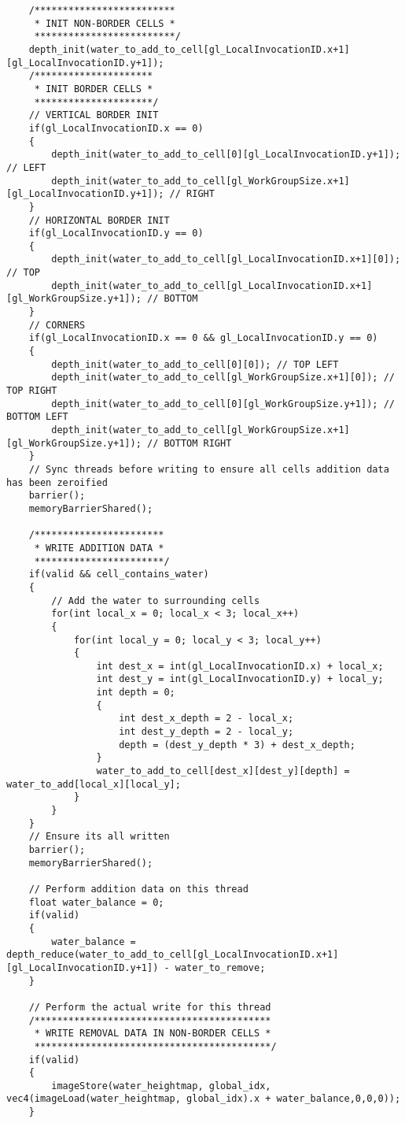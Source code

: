 \begin{verbatim}
    /*************************
     * INIT NON-BORDER CELLS *
     *************************/
    depth_init(water_to_add_to_cell[gl_LocalInvocationID.x+1][gl_LocalInvocationID.y+1]);
    /*********************
     * INIT BORDER CELLS *
     *********************/
    // VERTICAL BORDER INIT
    if(gl_LocalInvocationID.x == 0)
    {
        depth_init(water_to_add_to_cell[0][gl_LocalInvocationID.y+1]); // LEFT
        depth_init(water_to_add_to_cell[gl_WorkGroupSize.x+1][gl_LocalInvocationID.y+1]); // RIGHT
    }
    // HORIZONTAL BORDER INIT
    if(gl_LocalInvocationID.y == 0)
    {
        depth_init(water_to_add_to_cell[gl_LocalInvocationID.x+1][0]); // TOP
        depth_init(water_to_add_to_cell[gl_LocalInvocationID.x+1][gl_WorkGroupSize.y+1]); // BOTTOM
    }
    // CORNERS
    if(gl_LocalInvocationID.x == 0 && gl_LocalInvocationID.y == 0)
    {
        depth_init(water_to_add_to_cell[0][0]); // TOP LEFT
        depth_init(water_to_add_to_cell[gl_WorkGroupSize.x+1][0]); // TOP RIGHT
        depth_init(water_to_add_to_cell[0][gl_WorkGroupSize.y+1]); // BOTTOM LEFT
        depth_init(water_to_add_to_cell[gl_WorkGroupSize.x+1][gl_WorkGroupSize.y+1]); // BOTTOM RIGHT
    }
    // Sync threads before writing to ensure all cells addition data has been zeroified
    barrier();
    memoryBarrierShared();

    /***********************
     * WRITE ADDITION DATA *
     ***********************/
    if(valid && cell_contains_water)
    {
        // Add the water to surrounding cells
        for(int local_x = 0; local_x < 3; local_x++)
        {
            for(int local_y = 0; local_y < 3; local_y++)
            {
                int dest_x = int(gl_LocalInvocationID.x) + local_x;
                int dest_y = int(gl_LocalInvocationID.y) + local_y;
                int depth = 0;
                {
                    int dest_x_depth = 2 - local_x;
                    int dest_y_depth = 2 - local_y;
                    depth = (dest_y_depth * 3) + dest_x_depth;
                }
                water_to_add_to_cell[dest_x][dest_y][depth] = water_to_add[local_x][local_y];
            }
        }
    }
    // Ensure its all written
    barrier();
    memoryBarrierShared();

    // Perform addition data on this thread
    float water_balance = 0;
    if(valid)
    {
        water_balance = depth_reduce(water_to_add_to_cell[gl_LocalInvocationID.x+1][gl_LocalInvocationID.y+1]) - water_to_remove;
    }

    // Perform the actual write for this thread
    /******************************************
     * WRITE REMOVAL DATA IN NON-BORDER CELLS *
     ******************************************/
    if(valid)
    {
        imageStore(water_heightmap, global_idx, vec4(imageLoad(water_heightmap, global_idx).x + water_balance,0,0,0));
    }


\end{verbatim}
